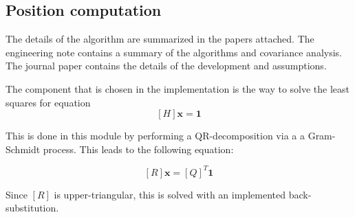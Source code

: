\subsection{Position computation}

The details of the algorithm are summarized in the papers attached. The engineering note contains a summary of the algorithms and covariance analysis. The journal paper \cite{Chirstian_Limb} contains the details of the development and assumptions. 

The component that is chosen in the implementation is the way to solve the least squares for equation $$[H] \bm x = \bm 1$$

This is done in this module by performing a QR-decomposition via a a Gram-Schmidt process. This leads to the following equation:

$$[R] \bm x = [Q]^T\bm 1$$

Since $[R]$ is upper-triangular, this is solved with an implemented back-substitution. 
